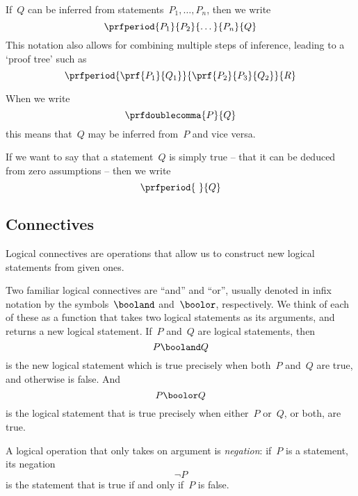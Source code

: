 If~$Q$ can be inferred from statements~$P_1, \ldots, P_n$, then we write
\begin{equation}
    \prfperiod{
        P_1
    }{
        P_2
    }{
        \dots
    }{
        P_n
    }{
        Q
    }
\end{equation}
This notation also allows for combining multiple steps of inference, leading to a `proof tree' such as
\begin{equation}
    \prfperiod{
        \prf{
            P_1
        }{
            Q_1
        }
    }{
        \prf{
            P_2
        }{
            P_3
        }{
            Q_2
        }
    }{
        R
    }
\end{equation}

When we write
\begin{equation}
    \prfdoublecomma{
        P
    }{
        Q
    }
\end{equation}
this means that~$Q$ may be inferred from~$P$ and vice versa.

If we want to say that a statement~$Q$ is simply true -- that it can be deduced from zero assumptions -- then we write
\begin{equation}
    \prfperiod{
        \
    }{
        Q
    }
\end{equation}

\subsection{Connectives}

Logical connectives are operations that allow us to construct new logical statements from given ones.

Two familiar logical connectives are ``and'' and ``or'', usually denoted in infix notation by the symbols~$\booland$ and~$\boolor$, respectively.
We think of each of these as a function that takes two logical statements as its arguments, and returns a new logical statement.
If~$P$ and~$Q$ are logical statements, then
%
\begin{equation}
    P \booland Q
\end{equation}
%
is the new logical statement which is true precisely when both~$P$ and~$Q$ are true, and otherwise is false.
And
\begin{equation}
    P \boolor Q
\end{equation}
is the logical statement that is true precisely when either~$P$ or~$Q$, or both, are true.

A logical operation that only takes on argument is \emph{negation}: if~$P$ is a statement, its negation
\begin{equation}
    \lnot P
\end{equation}
is the statement that is true if and only if~$P$ is false.

